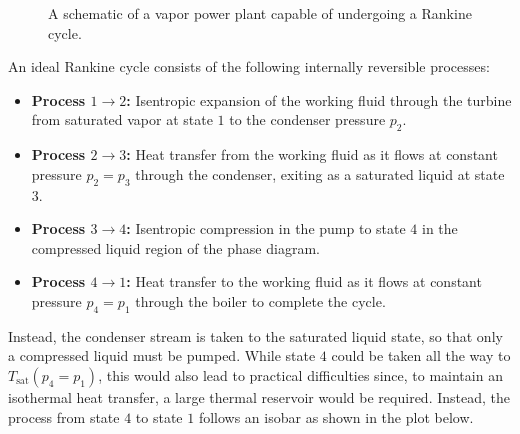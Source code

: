 \begin{figure}[h]
\begin{center}
\end{center}
\caption{A schematic of a vapor power plant capable of undergoing a Rankine cycle.}\label{fig:IdealRankineCycle}
\end{figure}

An ideal Rankine cycle consists of the following internally reversible processes: 
\begin{itemize}
\item \textbf{Process $1\to 2$:} Isentropic expansion of the working fluid through the turbine from saturated vapor at state $1$ to the condenser pressure $p_2$.
\item \textbf{Process $2\to 3$:} Heat transfer from the working fluid as it flows at constant pressure $p_2 = p_3$ through the condenser, exiting as a saturated liquid at state $3$. 
\item \textbf{Process $3\to 4$:} Isentropic compression in the pump to state $4$ in the compressed liquid region of the phase diagram.
\item \textbf{Process $4\to 1$:} Heat transfer to the working fluid as it flows at constant pressure $p_4 = p_1$ through the boiler to complete the cycle. 
\end{itemize}


Instead, the condenser stream is taken to the saturated liquid state, so that only a compressed liquid must be pumped. While state $4$ could be taken all the way to $T_{\text{sat}}(p_4 = p_1)$, this would also lead to practical difficulties since, to maintain an isothermal heat transfer, a large thermal reservoir would be required. Instead, the process from state $4$ to state $1$ follows an isobar as shown in the plot below. 

